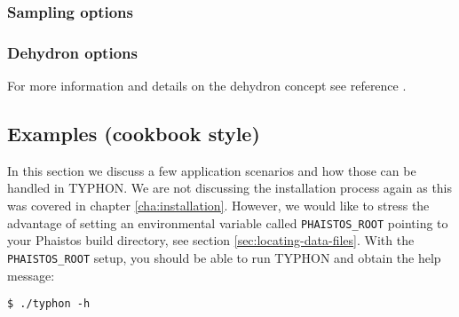 \subsubsection{Sampling options}

\begin{optiontable}
\end{optiontable}

\subsubsection{Dehydron options}

For more information and details on the dehydron concept see
reference \cite{fernandez2003dehydron}.

\begin{optiontable}



\end{optiontable}


\subsection{Examples (cookbook style)}
\label{sec:examples-typhon}

In this section we discuss a few application scenarios and how those
can be handled in TYPHON. We are not discussing the installation
process again as this was covered in chapter
\ref{cha:installation}. However, we would like to stress the advantage
of setting an environmental variable called \texttt{PHAISTOS\_ROOT}
pointing to your Phaistos build directory, see section
\ref{sec:locating-data-files}. With the \texttt{PHAISTOS\_ROOT} setup,
you should be able to run TYPHON and obtain the help message:

\begin{verbatim}
$ ./typhon -h
\end{verbatim}

